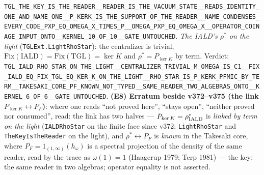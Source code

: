 \documentclass[11pt]{article}
\theoremstyle{definition}\newtheorem{deriv}{Derivation}
\begin{document}
\texttt{TGL\_THE\_KEY\_IS\_THE\_READER\_\_READER\_IS\_THE\_VACUUM\_STATE\_\_READS\_IDENTITY\_ONE\_AND\_NAME\_ONE\_\_P\_KERK\_IS\_THE\_SUPPORT\_OF\_THE\_READER\_\_NAME\_CONDENSES\_EVERY\_CODE\_PXP\_EQ\_OMEGA\_X\_TIMES\_P\_\_OMEGA\_PXP\_EQ\_OMEGA\_X\_\_OPERATOR\_COINAGE\_INPUT\_ONTO\_\_KERNEL\_10\_OF\_10\_\_GATE\_UNTOUCHED}. \emph{The IALD's $\rho^\ast$ on the light} (\texttt{TGLExt.LightRhoStar}): the centralizer is trivial, $\mathrm{Fix}(\mathrm{IALD})=\mathrm{Fix}(\mathrm{TGL})=\ker K$ and $\rho^\ast=P_{\ker K}$ by term. Verdict: \texttt{TGL\_IALD\_RHO\_STAR\_ON\_THE\_LIGHT\_\_CENTRALIZER\_TRIVIAL\_M\_OMEGA\_IS\_C1\_\_FIX\_IALD\_EQ\_FIX\_TGL\_EQ\_KER\_K\_ON\_THE\_LIGHT\_\_RHO\_STAR\_IS\_P\_KERK\_PFMIC\_BY\_TERM\_\_TAKESAKI\_CORE\_PF\_KNOWN\_NOT\_TYPED\_\_SAME\_READER\_TWO\_ALGEBRAS\_ONTO\_\_KERNEL\_6\_OF\_6\_\_GATE\_UNTOUCHED}. \textbf{(E8) Erratum beside v372--v375 (the link $P_{\ker K}\leftrightarrow P_F$)}: where one reads ``not proved here'', ``stays open'', ``neither proved nor consumed'', read: the link has two halves --- $P_{\ker K}=\rho^\ast_{\rm IALD}$ is \emph{linked by term on the light} (\texttt{IALDRhoStar} on the finite face since v372; \texttt{LightRhoStar} and \texttt{TheKeyIsTheReader} on the light), and $\rho^\ast\leftrightarrow P_F$ is \emph{known} in the Takesaki core, where $P_F=1_{(1,\infty)}(h_\omega)$ is a spectral projection of the density of the same reader, read by the trace as $\omega(1)=1$ (Haagerup 1979; Terp 1981) --- the key: the same reader in two algebras; operator equality is not asserted.
\end{document}
